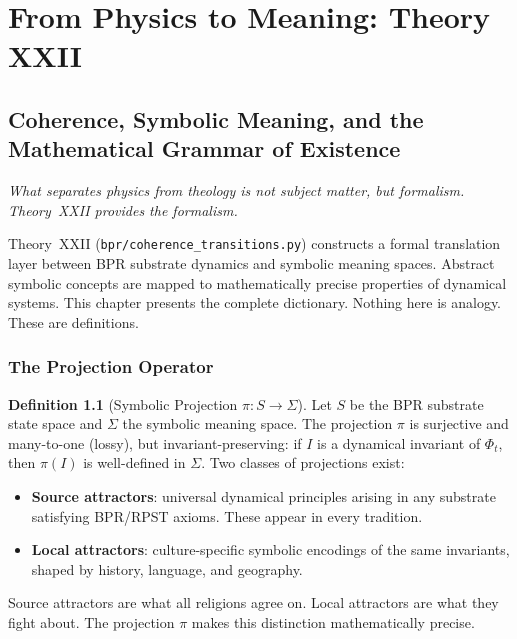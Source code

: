 \documentclass[12pt,oneside]{book}
\theoremstyle{definition}
\newtheorem{definition}{Definition}[chapter]
\begin{document}
\part{From Physics to Meaning: Theory XXII}

\chapter{Coherence, Symbolic Meaning, and the Mathematical Grammar of Existence}
\label{chap:theory22}

\epigraph{\itshape What separates physics from theology is not subject matter,
but formalism. Theory~XXII provides the formalism.}{}

Theory~XXII (\texttt{bpr/coherence\_transitions.py}) constructs a formal
translation layer between BPR substrate dynamics and symbolic meaning spaces.
Abstract symbolic concepts are mapped to mathematically precise properties of
dynamical systems. This chapter presents the complete dictionary. Nothing here is
analogy. These are definitions.

\section{The Projection Operator}

\begin{definition}[Symbolic Projection $\pi: S \to \Sigma$]
  Let $S$ be the BPR substrate state space and $\Sigma$ the symbolic meaning space.
  The projection $\pi$ is surjective and many-to-one (lossy), but invariant-preserving:
  if $I$ is a dynamical invariant of $\Phi_t$, then $\pi(I)$ is well-defined in $\Sigma$.
  Two classes of projections exist:
  \begin{itemize}
    \item \textbf{Source attractors}: universal dynamical principles arising in any
      substrate satisfying BPR/RPST axioms. These appear in every tradition.
    \item \textbf{Local attractors}: culture-specific symbolic encodings of the same
      invariants, shaped by history, language, and geography.
  \end{itemize}
\end{definition}

Source attractors are what all religions agree on. Local attractors are what they
fight about. The projection $\pi$ makes this distinction mathematically precise.
\end{document}
